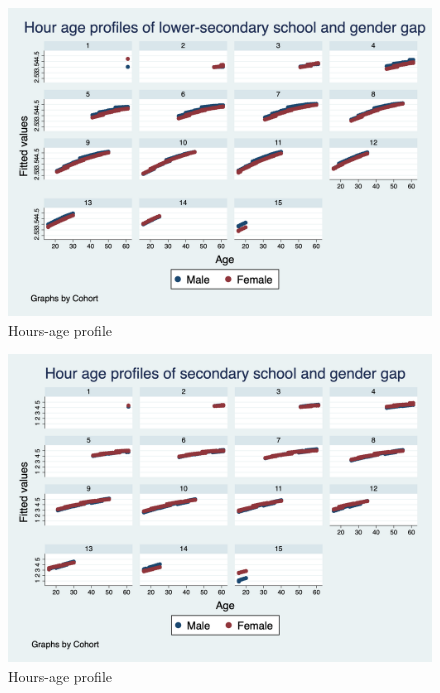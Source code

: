 \documentclass{sistedes}
\begin{document}
\begin{figure}
    \centering
    \includegraphics[scale=0.3]{graph5.png}
    \caption{\label{fig:h_l_cohorts}Hours-age profile}
    
\end{figure}
\begin{figure}
    \centering
    \includegraphics[scale=0.3]{graph6.png}
    \caption{\label{fig:h_h_cohorts}Hours-age profile}
    
\end{figure}
\end{document}
